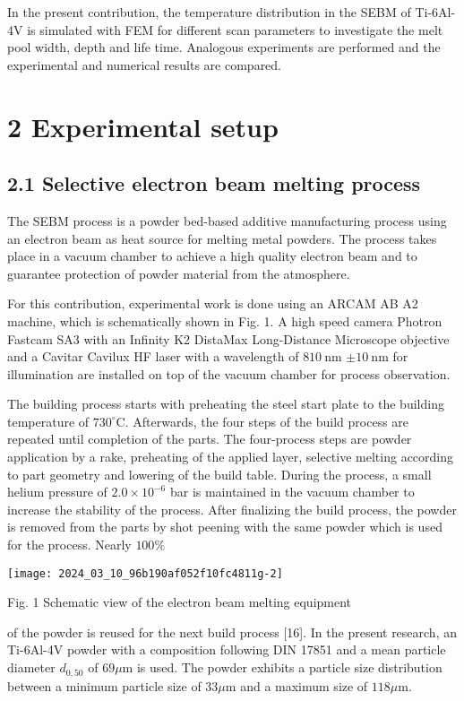 \documentclass[10pt]{article}
\begin{document}
In the present contribution, the temperature distribution in the SEBM of Ti-6Al-4V is simulated with FEM for different scan parameters to investigate the melt pool width, depth and life time. Analogous experiments are performed and the experimental and numerical results are compared.

\section*{2 Experimental setup}
\subsection*{2.1 Selective electron beam melting process}
The SEBM process is a powder bed-based additive manufacturing process using an electron beam as heat source for melting metal powders. The process takes place in a vacuum chamber to achieve a high quality electron beam and to guarantee protection of powder material from the atmosphere.

For this contribution, experimental work is done using an ARCAM AB A2 machine, which is schematically shown in Fig. 1. A high speed camera Photron Fastcam SA3 with an Infinity K2 DistaMax Long-Distance Microscope objective and a Cavitar Cavilux HF laser with a wavelength of $810 \mathrm{~nm}$ $\pm 10 \mathrm{~nm}$ for illumination are installed on top of the vacuum chamber for process observation.

The building process starts with preheating the steel start plate to the building temperature of $730^{\circ} \mathrm{C}$. Afterwards, the four steps of the build process are repeated until completion of the parts. The four-process steps are powder application by a rake, preheating of the applied layer, selective melting according to part geometry and lowering of the build table. During the process, a small helium pressure of $2.0 \times 10^{-6}$ bar is maintained in the vacuum chamber to increase the stability of the process. After finalizing the build process, the powder is removed from the parts by shot peening with the same powder which is used for the process. Nearly $100 \%$

\begin{center}
\texttt{[image: 2024\_03\_10\_96b190af052f10fc4811g-2]}
\end{center}

Fig. 1 Schematic view of the electron beam melting equipment

of the powder is reused for the next build process [16]. In the present research, an Ti-6Al-4V powder with a composition following DIN 17851 and a mean particle diameter $d_{0,50}$ of $69 \mu \mathrm{m}$ is used. The powder exhibits a particle size distribution between a minimum particle size of $33 \mu \mathrm{m}$ and a maximum size of $118 \mu \mathrm{m}$.
\end{document}
